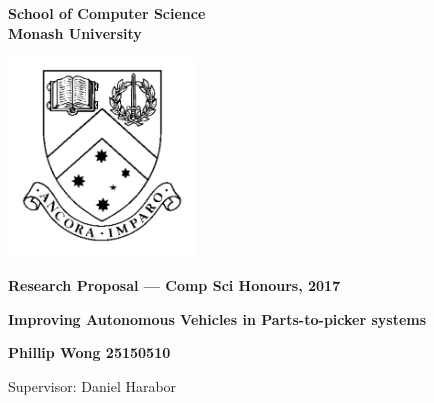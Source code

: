 \documentclass[a4paper,11pt]{article}
\begin{document}
\thispagestyle{empty} %
\renewcommand{\thepage}{\roman{page}}

\begin{spacing}{1.5}
\begin{center}
{\Large \bfseries
School of Computer Science \\
Monash University}

\vspace*{30mm}

\includegraphics[width=5cm]{MonashCrest.pdf}

\vspace*{15mm}

{\large \bfseries
Research Proposal --- Comp Sci Honours, 2017
}

\vspace*{10mm}

{\LARGE \bfseries
Improving Autonomous Vehicles in Parts-to-picker systems
}

\vspace*{20mm}

{\large \bfseries
Phillip Wong 25150510

\vspace*{20mm}


Supervisor: Daniel Harabor
}

\end{center}
\end{spacing}

\newpage

\tableofcontents

\newpage
\setcounter{page}{1}
\renewcommand{\thepage}{\arabic{page}}

	\begin{abstract} %
	\noindent \textbf{TODO} Warehouse Automation is a cooperative multi-agent pathfinding problem where a number of agents are individually moving inventory from shelves to a picking station.
	
	This project will be looking at two aspects which we suspect will decrease complexity of the pathfinding.
	
	First, is the configuration of the warehouse. 
	
	Second, is the positioning of the inventory.
	
	Lastly, we will look at improving on existing cooperative pathfinding techniques - specifically Conflict-Oriented Windowed Hierarchical Cooperative A∗.
	
	
\end{abstract}
\end{document}
